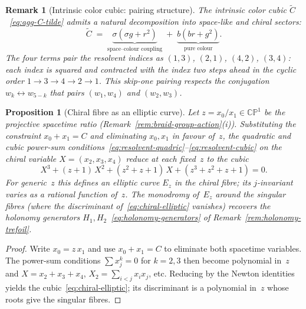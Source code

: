 \documentclass[12pt,a4paper]{report}
\newtheorem{proposition}[theorem]{Proposition}
\newtheorem{remark}[theorem]{Remark}
\begin{document}
\begin{remark}[Intrinsic color cubic: pairing structure]
\label{rem:intrinsic-color-cubic-pairing}
  The intrinsic color cubic $\widetilde{C}$~\eqref{eq:agg-C-tilde}
  admits a natural decomposition into space-like and chiral sectors:
  \begin{equation}\label{eq:color-cubic-decomp}
    \widetilde{C}
    \;=\;
    \underbrace{\sigma(\sigma g + r^2)}_{\text{space--colour coupling}}
    \;+\;
    \underbrace{b(br + g^2)}_{\text{pure colour}}.
  \end{equation}
  The four terms pair the resolvent indices as $(1,3)$, $(2,1)$, $(4,2)$,
  $(3,4)$: each index is squared and contracted with the index two steps
  ahead in the cyclic order $1 \to 3 \to 4 \to 2 \to 1$.  This
  skip-one pairing respects the conjugation $w_k \leftrightarrow w_{5-k}$
  that pairs $(w_1, w_4)$ and $(w_2, w_3)$.
\end{remark}

\begin{proposition}[Chiral fibre as an elliptic curve]
\label{prop:chiral-elliptic}
Let $z=x_0/x_1\in\mathbb{CP}^1$ be the projective spacetime ratio
(Remark~\ref{rem:braid-group-action}\textup{(i)}).  Substituting the
constraint $x_0+x_1=C$ and eliminating $x_0,x_1$ in favour of~$z$,
the quadratic and cubic power-sum
conditions~\eqref{eq:resolvent-quadric}--\eqref{eq:resolvent-cubic} on
the chiral variable $X=(x_2,x_3,x_4)$ reduce at each fixed~$z$ to the
cubic
\begin{equation}\label{eq:chiral-elliptic}
  X^3+(z+1)\,X^2+(z^2+z+1)\,X+(z^3+z^2+z+1)=0.
\end{equation}
For generic~$z$ this defines an elliptic curve $E_z$ in the chiral
fibre; its $j$-invariant varies as a rational function of~$z$.  The
monodromy of~$E_z$ around the singular fibres (where the discriminant
of~\eqref{eq:chiral-elliptic} vanishes) recovers the holonomy
generators $H_1,H_2$~\eqref{eq:holonomy-generators} of
Remark~\ref{rem:holonomy-trefoil}.
\end{proposition}
\begin{proof}
Write $x_0=z\,x_1$ and use $x_0+x_1=C$ to eliminate both spacetime
variables.  The power-sum conditions $\sum x_j^k=0$ for $k=2,3$ then
become polynomial in~$z$ and $X=x_2+x_3+x_4$, $X_2=\sum_{i<j}x_ix_j$,
etc.  Reducing by the Newton identities yields the
cubic~\eqref{eq:chiral-elliptic}; its discriminant is a polynomial
in~$z$ whose roots give the singular fibres.
\end{proof}
\end{document}
